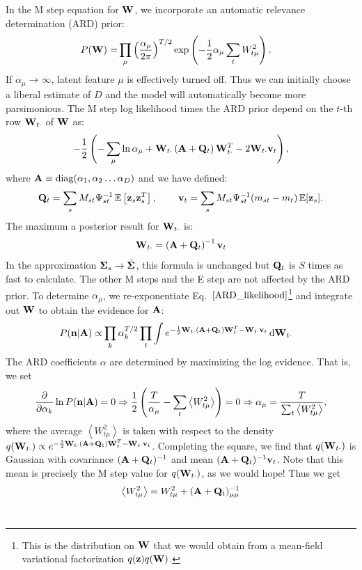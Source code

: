 \documentclass[nofootinbib,amssymb,amsmath]{revtex4}
\newcommand{\ave}[1]{\left\langle #1 \right\rangle}
\newcommand{\vv}{{\bf v}}
\newcommand{\vz}{{\bf z}}
\newcommand{\vn}{{\bf n}}
\newcommand{\vQ}{{\bf Q}}
\newcommand{\vW}{{\bf W}}
\newcommand{\vSigma}{{\bf \Sigma}}
\newcommand{\vA}{{\bf A}}
\newcommand{\EE}{\mathbb{E}}
\begin{document}
In the M step equation for $\vW$, we incorporate an automatic relevance determination (ARD) prior:
%
\begin{align}
P(\vW) =& \prod_\mu \left( \frac{\alpha_\mu}{2 \pi} \right)^{T/2} \exp \left( -\frac{1}{2} \alpha_\mu \sum_t W_{t\mu}^2  \right).
\end{align}
%
If $\alpha_\mu \rightarrow \infty$, latent feature $\mu$ is effectively turned off. Thus we can initially choose a liberal estimate of $D$ and the model will automatically become more parsimonious. The M step log likelihood times the ARD prior depend on the $t$-th row $\vW_{t \cdot}$ of $\vW$ as:
%
\begin{equation*}
 -\frac{1}{2}   \left( -\sum_\mu \ln \alpha_\mu  + \vW_{t \cdot} \left(\vA +  \vQ_t  \right) \vW_{t \cdot}^T - 2 \vW_{t \cdot} \vv_t  \right),
 \label{ARD_likelihood}
\end{equation*}
%
where $\vA \equiv {\rm diag}(\alpha_1, \alpha_2 \ldots \alpha_D)$ and we have defined:
%
\begin{equation}
\vQ_t = \sum_s M_{st} \Psi_{st}^{-1} \, \EE\left[\vz_s \vz_s^T\right], \, \qquad \vv_t = \sum_s M_{st} \Psi_{st}^{-1} (m_{st} - m_t)\, \EE[\vz_s].
\end{equation}
%
The maximum a posterior result for $\vW_{t \cdot}$ is:
%
\begin{equation}
\vW_{t \cdot} = \left(  \vA + \vQ_t \right)^{-1} \vv_t
\label{M_step_W}
\end{equation}
%
In the approximation $\vSigma_s \rightarrow \bar{\vSigma}$, this formula is unchanged but $\vQ_t$ is $S$ times as fast to calculate. The other M steps and the E step are not affected by the ARD prior. To determine $\alpha_\mu$, we re-exponentiate Eq.~$\eqref{ARD_likelihood}$\footnote{This is the distribution on $\vW$ that we would obtain from a mean-field variational factorization $q(\vz) q(\vW)$.} and integrate out $\vW$ to obtain the evidence for $\vA$:
%
\begin{align}
P(\vn | \vA) \propto& \prod_k \alpha_k^{T/2} \prod_t \int e^{-\frac{1}{2} \vW_{t \cdot} (\vA + \vQ_t) \vW_{t \cdot}^T - \vW_{t \cdot} \vv_t} \, \mathrm{d} \vW_{t \cdot}
\label{ARD_evidence}
\end{align}
%
The ARD coefficients $\alpha$ are determined by maximizing the log evidence.  That is, we set
\begin{align}
\frac{\partial}{\partial \alpha_k} \ln P(\vn | \vA) = 0 \Rightarrow  \frac{1}{2} \left( \frac{T}{\alpha_\mu}  - \sum_t \ave{W_{t\mu}^2} \right) = 0 \Rightarrow \alpha_\mu = \frac{T}{\sum_t \ave{W_{t\mu}^2}},
\end{align}
where the average $\ave{W_{t\mu}^2}$ is taken with respect to the density $q(\vW_{t \cdot}) \propto e^{-\frac{1}{2} \vW_{t \cdot} (\vA + \vQ_t) \vW_{t \cdot}^T - \vW_{t \cdot} \vv_t}$.  Completing the square, we find that $q(\vW_{t \cdot})$ is Gaussian with covariance $(\vA + \vQ_t)^{-1}$ and mean $(\vA + \vQ_t)^{-1} \vv_t$.  Note that this mean is precisely the M step value for $q(\vW_{t \cdot})$, as we would hope!  Thus we get
%
\begin{equation}
\ave{W_{t\mu}^2} = W_{t\mu}^2 + (\vA + \vQ_t)^{-1}_{\mu\mu}
\end{equation}\\
%
\end{document}
